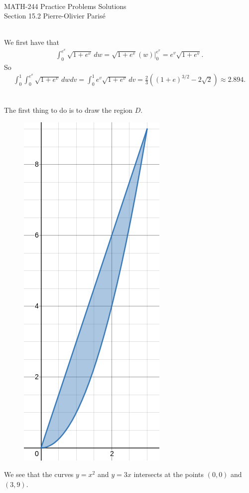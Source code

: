 


	\noindent \hrulefill \\
	MATH-244 \semester \hfill Practice Problems Solutions\\
	Section 15.2 \hfill Pierre-Olivier Paris{\'e} \\\vspace*{-1cm}
	
	\noindent\hrulefill
	
	\spc	

	\\
	We first have that
		\begin{align*}
		\int_0^{e^v} \sqrt{1 + e^v} \, dw = \sqrt{1 + e^v} \left. \left( w \right) \right|_{0}^{e^v} = e^v \sqrt{1 + e^v} .
		\end{align*}
	So
		\begin{align*}
		\int_0^1 \int_0^{e^v} \sqrt{1 + e^v} \, dw dv = \int_0^1 e^v \sqrt{1 + e^v} \, dv = \frac{2}{3} ( (1 + e)^{3/2} - 2 \sqrt{2} ) \approx 2.894 .
		\end{align*}
	
	\spc
	
	\\
	The first thing to do is to draw the region $D$.
	
		\begin{figure}[h]
		\centering
		\includegraphics[scale=0.3]{sketch-exo14-Domain.png}
		\end{figure}
	We see that the curves $y = x^2$ and $y = 3x$ intersects at the points $(0,0)$ and $(3, 9)$.
	
